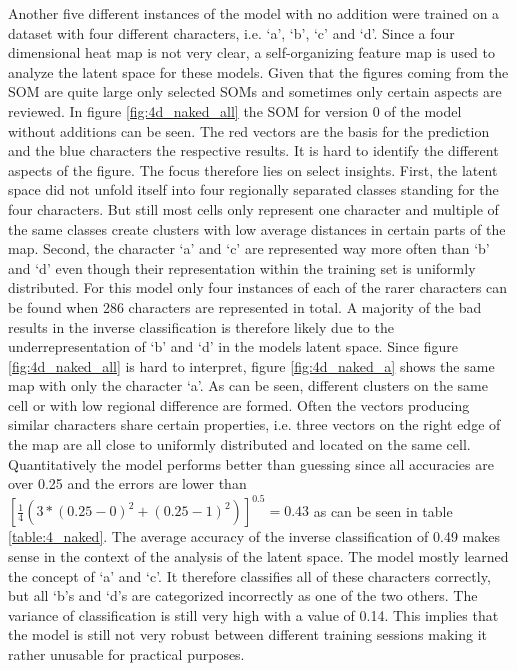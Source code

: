 Another five different instances of the model with no addition were trained on a dataset with four different characters, i.e. `a', `b', `c' and `d'. Since a four dimensional heat map is not very clear, a self-organizing feature map is used to analyze the latent space for these models. Given that the figures coming from the SOM are quite large only selected SOMs and sometimes only certain aspects are reviewed. In figure \ref{fig:4d_naked_all}
the SOM for version 0 of the model without additions can be seen. The red vectors are the basis for the prediction and the blue characters the respective results. It is hard to identify the different aspects of the figure. The focus therefore lies on select insights. First, the latent space did not unfold itself into four regionally separated classes standing for the four characters. But still most cells only represent one character and multiple of the same classes create clusters with low average distances in certain parts of the map. Second, the character `a' and `c' are represented way more often than `b' and `d' even though their representation within the training set is uniformly distributed. For this model only four instances of each of the rarer characters can be found when 286 characters are represented in total. A majority of the bad results in the inverse classification is therefore likely due to the underrepresentation of `b' and `d' in the models latent space. Since figure \ref{fig:4d_naked_all} is hard to interpret, figure \ref{fig:4d_naked_a} shows the same map with only the character `a'. As can be seen, different clusters on the same cell or with low regional difference are formed. Often the vectors producing similar characters share certain properties, i.e. three vectors on the right edge of the map are all close to uniformly distributed and located on the same cell. Quantitatively the model performs better than guessing since all accuracies are over 0.25 and the  errors are lower than $[\frac{1}{4} (3*(0.25 -0)^2 + (0.25 -1)^2)]^{0.5} = 0.43$ as can be seen in table \ref{table:4_naked}. The average accuracy of the inverse classification of 0.49 makes sense in the context of the analysis of the latent space. The model mostly learned the concept of `a' and `c'. It therefore classifies all of these characters correctly, but all `b's and `d's are categorized incorrectly as one of the two others. The variance of classification is still very high with a value of 0.14. This implies that the model is still not very robust between different training sessions making it rather unusable for practical purposes.


